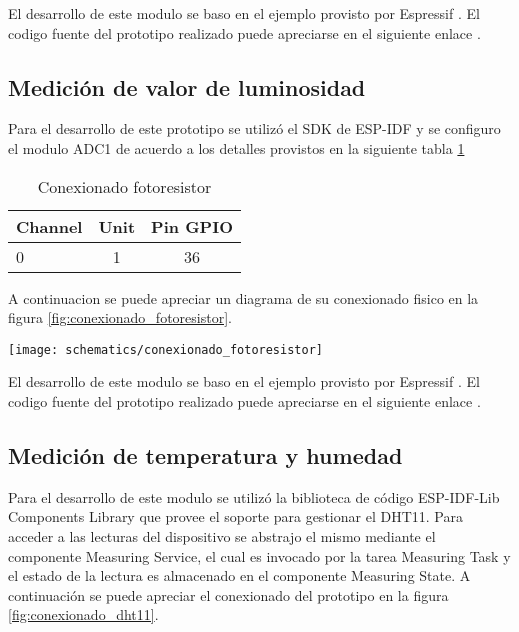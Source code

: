 El desarrollo de este modulo se baso en el ejemplo provisto por Espressif \cite{ESP32_ADC1_Example}. El codigo fuente del prototipo realizado puede apreciarse en el siguiente enlace \cite{ESP32_POC_joystick}.


\subsection{Medición de valor de luminosidad}
Para el desarrollo de este prototipo se utilizó el SDK de ESP-IDF y se configuro el modulo ADC1 de acuerdo a los detalles provistos en la siguiente tabla \ref{tab:conexionado_fotoresistor} 

\vspace{0.5cm}
\begin{table}[h]
\centering
\caption[Conexionado fotoresistor]{Conexionado fotoresistor}
\begin{tabular}{l c c}
\toprule
\textbf{Channel} & \textbf{Unit} & \textbf{Pin GPIO}\\
\midrule
0 & 1 & 36 \\
\bottomrule
\hline
\end{tabular}
\label{tab:conexionado_fotoresistor}
\end{table}

A continuacion se puede apreciar un diagrama de su conexionado fisico en la figura \ref{fig:conexionado_fotoresistor}.

\begin{center}
  \texttt{[image: schematics/conexionado\_fotoresistor]}
    \label{fig:conexionado_fotoresistor}
\end{center}

El desarrollo de este modulo se baso en el ejemplo provisto por Espressif \cite{ESP32_ADC1_Example}. El codigo fuente del prototipo realizado puede apreciarse en el siguiente enlace \cite{ESP32_POC_photoresistor}.

\subsection{Medición de temperatura y humedad}

Para el desarrollo de este modulo se utilizó la biblioteca de código ESP-IDF-Lib Components Library \cite{esp_idf_lib_website} que provee el soporte para gestionar el DHT11. Para acceder a las lecturas del dispositivo se abstrajo el mismo mediante el componente Measuring Service, el cual es invocado por la tarea Measuring Task y el estado de la lectura es almacenado en el componente Measuring State.
A continuación se puede apreciar el conexionado del prototipo en la figura \ref{fig:conexionado_dht11}.

